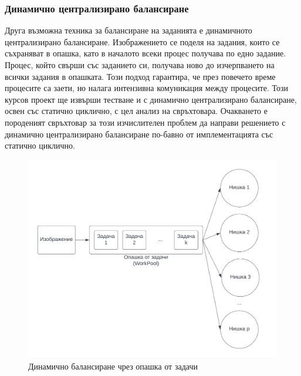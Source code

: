 \documentclass[a4paper,11pt]{article}
\begin{document}
\subsubsection{Динамично централизирано балансиране}
Друга възможна техника за балансиране на заданията е динамичното централизирано балансиране. Изображението се поделя на задания, които се съхраняват в опашка, като в началото всеки процес получава по едно задание. Процес, който свърши със заданието си, получава ново до изчерпването на всички задания в опашката. Този подход гарантира, че през повечето време процесите са заети, но налага интензивна комуникация между процесите. Този курсов проект ще извърши тестване и с динамично централизирано балансиране, освен със статично циклично, с цел анализ на свръхтовара. Очакването е породеният свръхтовар за този изчислителен проблем да направи решението с динамично централизирано балансиране по-бавно от имплементацията със статично циклично. 
\begin{figure}[H]
    \centering
    \includegraphics[width=0.9\linewidth]{images/threadpool.png}
    \caption{Динамично балансиране чрез опашка от задачи}
    \label{fig:threadpool}
\end{figure}
\end{document}
